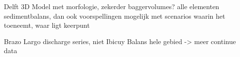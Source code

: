
Delft 3D Model met morfologie, zekerder baggervolumes? alle elementen sedimentbalans, dan ook voorspellingen mogelijk met scenarios waarin het toeneemt, waar ligt keerpunt

Brazo Largo discharge series, niet Ibicuy
Balans hele gebied -> meer continue data






